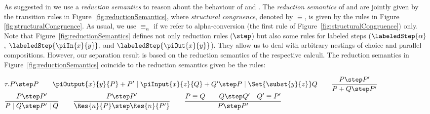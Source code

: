 \documentclass[]{article}
\begin{document}
As suggested in \cite{gorla} we use a \emph{reduction semantics} to reason about the behaviour of \piT and \piNM.
The \emph{reduction semantics} of \piT and \piNM are jointly given by the transition rules in Figure~\ref{fig:reductionSemantics}, where \emph{structural congruence}, denoted by $ \equiv $, is given by the rules in Figure \ref{fig:structuralCongruence}. As usual, we use $ \equiv_{\alpha} $ if we refer to alpha-conversion (the first rule of Figure~\ref{fig:structuralCongruence}) only.
Note that Figure~\ref{fig:reductionSemantics} defines not only reduction rules ($ \step $) but also some rules for labeled steps ($ \labeledStep{\alpha} $, $ \labeledStep{\piIn{x}{y}} $, and $ \labeledStep{\piOut{x}{y}} $). They allow us to deal with arbitrary nestings of choice and parallel compositions. However, our separation result is based on the reduction semantics of the respective calculi. The reduction semantics in Figure~\ref{fig:reductionSemantics} coincide to the reduction semantics given be the rules:
\begin{center}
	$ \tau.P \step P \hspace*{2em} \piOutput{x}{y}{P} + P' \mid \piInput{x}{z}{Q} + Q' \step P \mid \Set{ \subst{y}{z} }Q \hspace*{2em} \dfrac{P \step P'}{P + Q \step P'} $\vspace{0.75em}\\
	$ \dfrac{P \step P'}{P \mid Q \step P' \mid Q} \hspace*{2em} \dfrac{P \step P'}{\Res{n}{P} \step \Res{n}{P'}} \hspace*{2em} \dfrac{P \equiv Q \quad \quad Q \step Q' \quad Q' \equiv P'}{P \step P'} $\vspace{0.75em}
\end{center}
\end{document}
